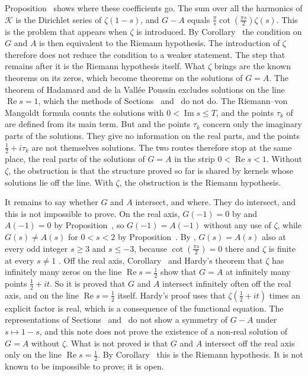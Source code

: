Proposition~ shows where these coefficients go. The sum over all the harmonics of $\mathcal K$ is the Dirichlet series of $\zeta(1-s)$, and $G-A$ equals $\frac\pi s\cot(\frac{\pi s}2)\zeta(s)$. This is the problem that appears when $\zeta$ is introduced. By Corollary~ the condition on $G$ and $A$ is then equivalent to the Riemann hypothesis. The introduction of $\zeta$ therefore does not reduce the condition to a weaker statement. The step that remains after it is the Riemann hypothesis itself. What $\zeta$ brings are the known theorems on its zeros, which become theorems on the solutions of $G=A$. The theorem of Hadamard and de la Vall\'ee Poussin excludes solutions on the line $\operatorname{Re}s=1$, which the methods of Sections~ and~ do not do. The Riemann--von Mangoldt formula  counts the solutions with $0<\operatorname{Im}s\le T$, and the points $\tau_k$ of  are defined from its main term. But  and the points $\tau_k$ concern only the imaginary parts of the solutions. They give no information on the real parts, and the points $\frac12+i\tau_k$ are not themselves solutions. The two routes therefore stop at the same place, the real parts of the solutions of $G=A$ in the strip $0<\operatorname{Re}s<1$. Without $\zeta$, the obstruction is that the structure proved so far is shared by kernels whose solutions lie off the line. With $\zeta$, the obstruction is the Riemann hypothesis.

It remains to say whether $G$ and $A$ intersect, and where. They do intersect, and this is not impossible to prove. On the real axis, $G(-1)=0$ by  and $A(-1)=0$ by Proposition~, so $G(-1)=A(-1)$ without any use of $\zeta$, while $G(s)\ne A(s)$ for $0<s<2$ by Proposition~. By , $G(s)=A(s)$ also at every odd integer $s\ge3$ and $s\le-3$, because $\cot(\frac{\pi s}2)=0$ there and $\zeta$ is finite at every $s\ne1$ \cite[Theorem~2.1, p.~13]{Titchmarsh1986}. Off the real axis, Corollary~ and Hardy's theorem that $\zeta$ has infinitely many zeros on the line $\operatorname{Re}s=\frac12$ \cite[\S10.2, p.~256]{Titchmarsh1986} show that $G=A$ at infinitely many points $\frac12+it$. So it is proved that $G$ and $A$ intersect infinitely often off the real axis, and on the line $\operatorname{Re}s=\frac12$ itself. Hardy's proof uses that $\zeta(\frac12+it)$ times an explicit factor is real, which is a consequence of the functional equation. The representations of Sections~ and~ do not show a symmetry of $G-A$ under $s\mapsto1-s$, and this note does not prove the existence of a non-real solution of $G=A$ without $\zeta$. What is not proved is that $G$ and $A$ intersect off the real axis only on the line $\operatorname{Re}s=\frac12$. By Corollary~ this is the Riemann hypothesis. It is not known to be impossible to prove; it is open.
